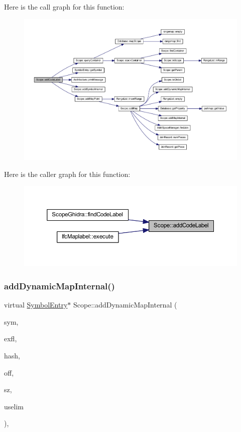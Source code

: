 Here is the call graph for this function\+:
\nopagebreak
\begin{figure}[H]
\begin{center}
\leavevmode
\includegraphics[width=350pt]{class_scope_a4dcaf595e4437d91af6a243ef0d49640_cgraph}
\end{center}
\end{figure}
Here is the caller graph for this function\+:
\nopagebreak
\begin{figure}[H]
\begin{center}
\leavevmode
\includegraphics[width=350pt]{class_scope_a4dcaf595e4437d91af6a243ef0d49640_icgraph}
\end{center}
\end{figure}
\mbox{\label{class_scope_a5d3b5f792b07b023d43309472cd6f4d9}} 
\subsubsection{\texorpdfstring{addDynamicMapInternal()}{addDynamicMapInternal()}}
{\footnotesize\ttfamily virtual \mbox{\hyperlink{class_symbol_entry}{Symbol\+Entry}}$\ast$ Scope\+::add\+Dynamic\+Map\+Internal (\begin{DoxyParamCaption}\item[{\mbox{\hyperlink{class_symbol}{Symbol}} $\ast$}]{sym,  }\item[{uint4}]{exfl,  }\item[{uint8}]{hash,  }\item[{int4}]{off,  }\item[{int4}]{sz,  }\item[{const \mbox{\hyperlink{class_range_list}{Range\+List}} \&}]{uselim }\end{DoxyParamCaption})\hspace{0.3cm}{\ttfamily [protected]}, {}}



